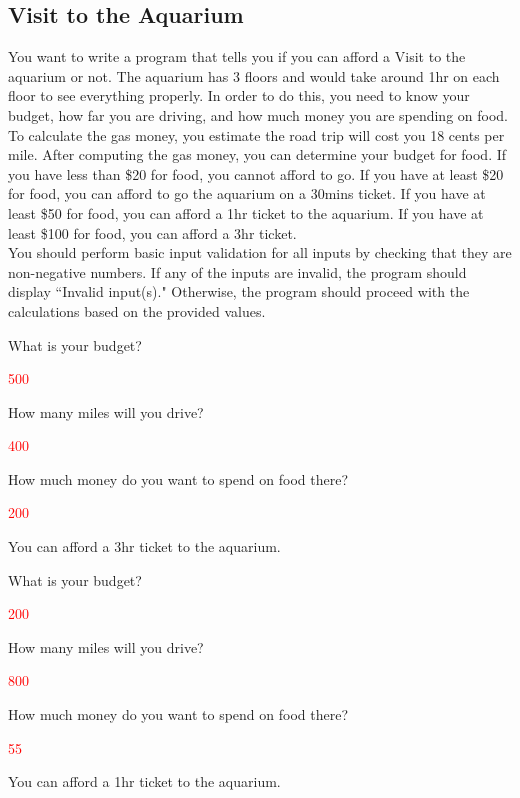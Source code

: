 \subsection{Visit to the Aquarium}

You want to write a program that tells you if you can afford a Visit to the aquarium or not. The aquarium has 3 floors and would take around 1hr on each floor to see everything properly. In order to do this, you need to know your budget, how far you are driving, and how much money you are spending on food. \\

To calculate the gas money, you estimate the road trip will cost you 18 cents per mile. After computing the gas money, you can determine your budget for food. If you have less than \$20 for food, you cannot afford to go. If you have at least \$20 for food, you can afford to go the aquarium on a 30mins ticket. If you have at least \$50 for food, you can afford a 1hr ticket to the aquarium. If you have at least \$100 for food, you can afford a 3hr ticket. \\

You should perform basic input validation for all inputs by checking that they are non-negative numbers. If any of the inputs are invalid, the program should display ``Invalid input(s)." Otherwise, the program should proceed with the calculations based on the provided values.

\begin{sample}
What is your budget?

\textcolor{red}{500}

How many miles will you drive?

\textcolor{red}{400}

How much money do you want to spend on food there? 

\textcolor{red}{200}

You can afford a 3hr ticket to the aquarium.
\end{sample}

\begin{sample}
What is your budget?

\textcolor{red}{200}

How many miles will you drive?

\textcolor{red}{800}

How much money do you want to spend on food there? 

\textcolor{red}{55}

You can afford a 1hr ticket to the aquarium.
\end{sample}

